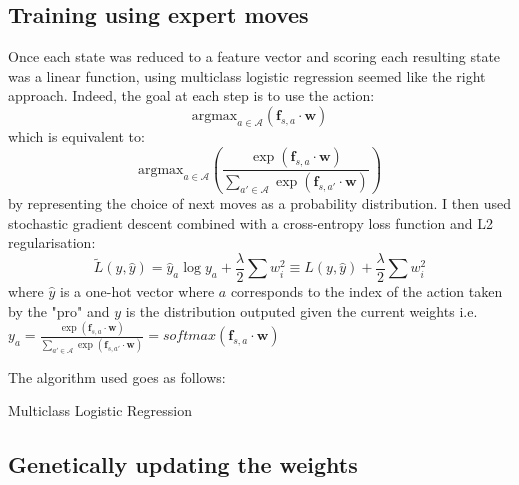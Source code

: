 \documentclass[11pt]{article}
\begin{document}
\subsection{Training using expert moves}
Once each state was reduced to a feature vector and scoring each resulting state was a linear function, using multiclass logistic regression seemed like the right approach. Indeed, the goal at each step is to use the action:
$$\text{argmax}_{a\in\mathcal{A}}(\mathbf{f}_{s,a}\cdot\mathbf{w})$$
which is equivalent to:
$$\text{argmax}_{a\in\mathcal{A}}\left(\frac{\exp(\mathbf{f}_{s,a}\cdot\mathbf{w})}{\sum\limits_{a'\in\mathcal{A}}\exp(\mathbf{f}_{s,a'}\cdot\mathbf{w})}\right)$$
by representing the choice of next moves as a probability distribution. I then used stochastic gradient descent combined with a cross-entropy loss function and L2 regularisation: $$\tilde{L}(y, \hat{y}) = \hat{y}_a\log y_a + \frac{\lambda}{2}\sum w_i^2 \equiv L(y, \hat{y})+ \frac{\lambda}{2}\sum w_i^2 $$
where $\hat{y}$ is a one-hot vector where $a$ corresponds to the index of the action taken by the "pro" and $y$ is the distribution outputed given the current weights i.e. $y_a = \frac{\exp(\mathbf{f}_{s,a}\cdot\mathbf{w})}{\sum\limits_{a'\in\mathcal{A}}\exp(\mathbf{f}_{s,a'}\cdot\mathbf{w})}=softmax(\mathbf{f}_{s,a}\cdot\mathbf{w})$

The algorithm used goes as follows:
\begin{algorithm}[H]
  \begin{algorithmic}
    \EndWhile{}
    
    \EndProcedure{}
  \end{algorithmic}
  \caption{Multiclass Logistic Regression}
\end{algorithm}

\subsection{Genetically updating the weights}
\end{document}
